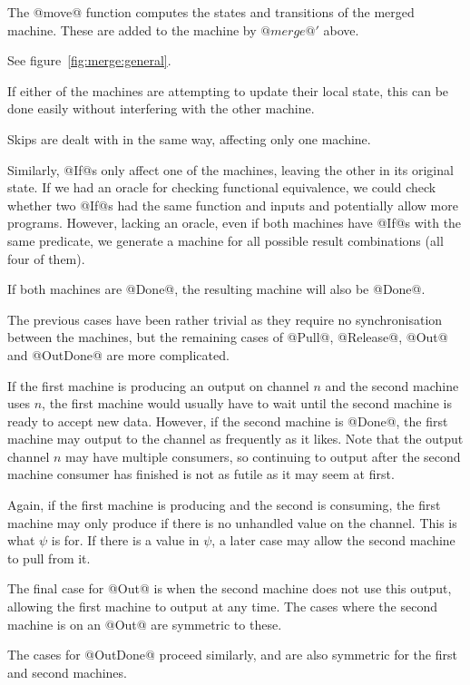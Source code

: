 The @move@ function computes the states and transitions of the merged machine.
These are added to the machine by $@merge@'$ above.

See figure~\ref{fig:merge:general}.



If either of the machines are attempting to update their local state, this can be done easily without interfering with the other machine.

Skips are dealt with in the same way, affecting only one machine.

Similarly, @If@s only affect one of the machines, leaving the other in its original state.
If we had an oracle for checking functional equivalence, we could check whether two @If@s had the same function and inputs and potentially allow more programs.
However, lacking an oracle, even if both machines have @If@s with the same predicate, we generate a machine for all possible result combinations (all four of them).

If both machines are @Done@, the resulting machine will also be @Done@.

The previous cases have been rather trivial as they require no synchronisation between the machines, but the remaining cases of @Pull@, @Release@, @Out@ and @OutDone@ are more complicated.

If the first machine is producing an output on channel $n$ and the second machine uses $n$, the first machine would usually have to wait until the second machine is ready to accept new data.
However, if the second machine is @Done@, the first machine may output to the channel as frequently as it likes.
Note that the output channel $n$ may have multiple consumers, so continuing to output after the second machine consumer has finished is not as futile as it may seem at first.

Again, if the first machine is producing and the second is consuming, the first machine may only produce if there is no unhandled value on the channel.
This is what $\psi$ is for.
If there is a value in $\psi$, a later case may allow the second machine to pull from it.

The final case for @Out@ is when the second machine does not use this output, allowing the first machine to output at any time.
The cases where the second machine is on an @Out@ are symmetric to these.

The cases for @OutDone@ proceed similarly, and are also symmetric for the first and second machines.

